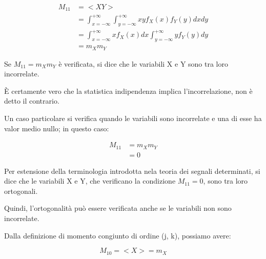 {
    \Large 
    \begin{equation}
        \begin{split}
            M_{1 1} 
            &= 
            <X Y>
            \\ 
            &= 
            \int_{x = -\infty}^{+ \infty}
            \int_{y = -\infty}^{+ \infty}
            x y 
            f_{X} (x) 
            f_{Y} (y) 
            dx 
            dy 
            \\ 
            &= 
            \int_{x = -\infty}^{+ \infty}
            x  
            f_{X} (x)
            dx 
            \int_{y = -\infty}^{+ \infty}
            y 
            f_{Y} (y) 
            dy 
            \\ 
            &= 
            m_X m_Y
        \end{split}
    \end{equation}
}

Se $ M_{1 1} =  m_X m_Y $ è verificata, si dice che le variabili X e Y sono tra loro incorrelate. \newline 

È certamente vero che la statistica indipendenza implica l'incorrelazione, non è detto il contrario. \newline 

Un caso particolare si verifica quando le variabili sono incorrelate e una di esse ha valor medio nullo; 
in questo caso: 

{
    \Large 
    \begin{equation}
        \begin{split}
            M_{1 1}
            &= 
            m_X m_Y 
            \\
            &= 
            0     
        \end{split}
    \end{equation}
}

Per estensione della terminologia introdotta nela teoria dei segnali determinati, si dice che le variabili 
X e Y, che verificano la condizione $M_{1 1} = 0$, sono tra loro ortogonali. \newline 

Quindi, l'ortogonalità può essere verificata anche se le variabili non sono incorrelate. \newline 

Dalla definizione di momento congiunto di ordine (j, k), possiamo avere: 

{
    \Large 
    \begin{equation}
        M_{1 0} = <X> = m_X
    \end{equation}
}

